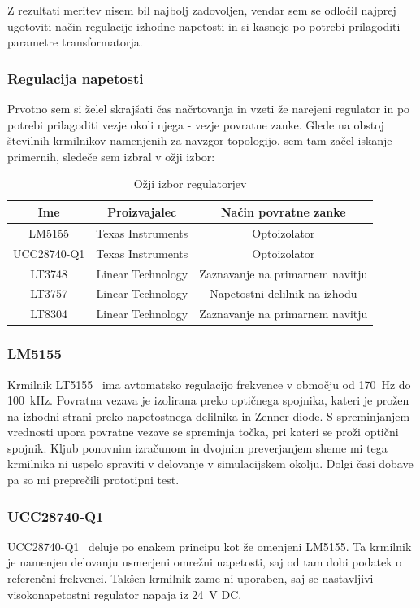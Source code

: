 \documentclass[a4paper,twoside,openright,12pt,Slovene]{book}
\begin{document}
Z rezultati meritev nisem bil najbolj zadovoljen, vendar sem se odločil najprej ugotoviti način regulacije izhodne napetosti in si kasneje po potrebi prilagoditi parametre transformatorja. 

	\subsubsection{Regulacija napetosti} \label{RegulacijaNapetosti}
	Prvotno sem si želel skrajšati čas načrtovanja in vzeti že narejeni regulator in po potrebi prilagoditi vezje okoli njega - vezje povratne zanke. Glede na obstoj številnih krmilnikov namenjenih za navzgor topologijo, sem tam začel iskanje primernih, sledeče sem izbral v ožji izbor:
	
\begin{table}[h!]
\centering
\begin{tabular}{||c | c |c||}
\hline
Ime & Proizvajalec & Način povratne zanke \\[0.5ex]
\hline\hline
LM5155 & Texas Instruments & Optoizolator \\
UCC28740-Q1 & Texas Instruments & Optoizolator \\
LT3748 & Linear Technology & Zaznavanje na primarnem navitju \\
LT3757 & Linear Technology & Napetostni delilnik na izhodu \\
LT8304 & Linear Technology & Zaznavanje na primarnem navitju \\ [1ex]

\hline
\end{tabular}
\caption{Ožji izbor regulatorjev}
\end{table}

	\subsubsection{LM5155} \label{LM5155}
Krmilnik LT5155~\cite{TI:LT5155} ima avtomatsko regulacijo frekvence v območju od \SI{170}{\hertz} do \SI{100}{\kilo\hertz}. Povratna vezava je izolirana preko optičnega spojnika, kateri je prožen na izhodni strani preko napetostnega delilnika in Zenner diode. S spreminjanjem vrednosti upora povratne vezave se spreminja točka, pri kateri se proži optični spojnik. Kljub ponovnim izračunom in dvojnim preverjanjem sheme mi tega krmilnika ni uspelo spraviti v delovanje v simulacijskem okolju. Dolgi časi dobave pa so mi preprečili prototipni test.


	\subsubsection{UCC28740-Q1} \label{UCC28740-Q1}
UCC28740-Q1~\cite{TI:UCC28740} deluje po enakem principu kot že omenjeni LM5155. Ta krmilnik je namenjen delovanju usmerjeni omrežni napetosti, saj od tam dobi podatek o referenčni frekvenci. Takšen krmilnik zame ni uporaben, saj se nastavljivi visokonapetostni regulator napaja iz \SI{24}{\volt} DC. 
\end{document}
